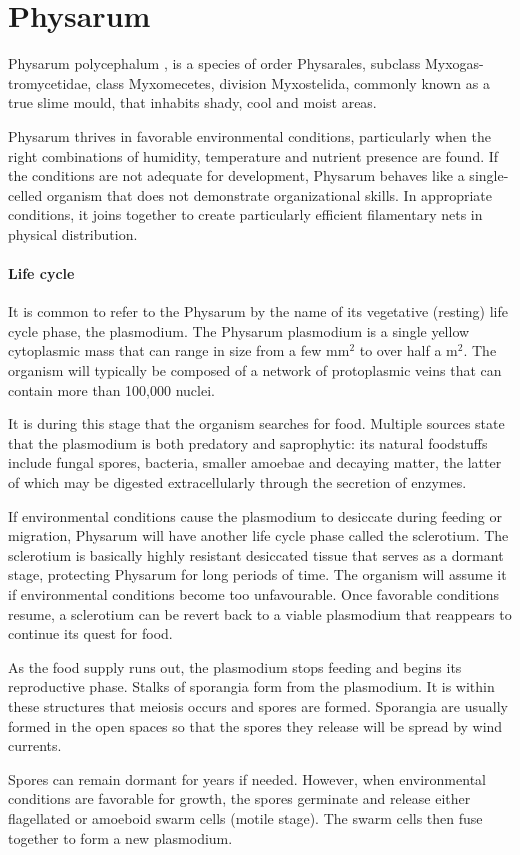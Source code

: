 \section{Physarum}

Physarum polycephalum \cite{sun2017physarum}, \cite{mayne2016biology} is a species of order Physarales, subclass Myxogas-tromycetidae, class Myxomecetes, division Myxostelida, commonly known as a true slime mould, that inhabits shady, cool and moist areas. 
\par
Physarum thrives in favorable environmental conditions, particularly when the right combinations of humidity, temperature and nutrient presence are found. If the conditions are not adequate for development, Physarum behaves like a single-celled organism that does not demonstrate organizational skills. In appropriate conditions, it joins together to create particularly efficient filamentary nets in physical distribution.
\paragraph{Life cycle}
It is common to refer to the Physarum by the name of its vegetative (resting) life cycle phase, the plasmodium. The Physarum plasmodium is a single yellow cytoplasmic mass that can range in size from a few mm$^2$ to over half a m$^2$. The organism will typically be composed of a network of protoplasmic veins that can contain more than 100,000 nuclei.
\par
It is during this stage that the organism searches for food. Multiple sources state that the plasmodium is both predatory and saprophytic: its natural foodstuffs include fungal spores, bacteria, smaller amoebae and decaying matter, the latter of which may be digested extracellularly through the secretion of enzymes.
\par
If environmental conditions cause the plasmodium to desiccate during feeding or migration, Physarum will have another life cycle phase called the sclerotium. The sclerotium is basically highly resistant desiccated tissue that serves as a dormant stage, protecting Physarum for long periods of time. The organism will assume it if environmental conditions become too
unfavourable. Once favorable conditions resume, a sclerotium can be revert back to a viable plasmodium that reappears to continue its quest for food.
\par
As the food supply runs out, the plasmodium stops feeding and begins its reproductive phase. Stalks of sporangia form from the plasmodium. It is within these structures that meiosis occurs and spores are formed. Sporangia are usually formed in the open spaces so that the spores they release will be spread by wind currents.
\par
Spores can remain dormant for years if needed. However, when environmental conditions are favorable for growth, the spores germinate and release either flagellated or amoeboid swarm cells (motile stage). The swarm cells then fuse together to form a new plasmodium. 

